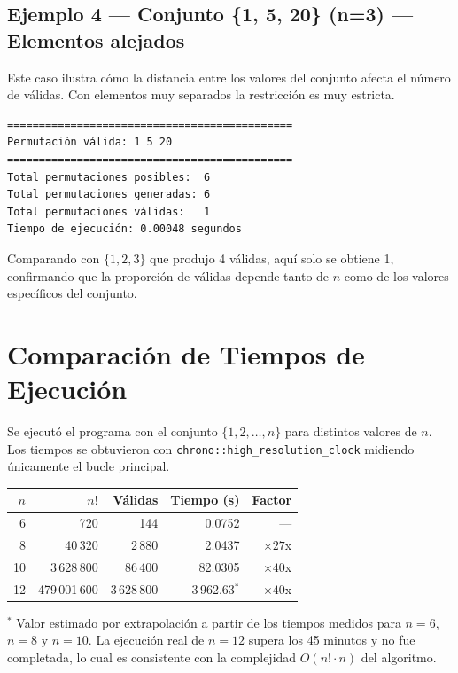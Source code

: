 \documentclass[12pt, a4paper]{article}
\begin{document}
\subsection{Ejemplo 4 --- Conjunto \{1, 5, 20\} (n=3) --- Elementos alejados}

Este caso ilustra cómo la distancia entre los valores del conjunto afecta el número
de válidas. Con elementos muy separados la restricción es muy estricta.

\begin{lstlisting}[style=pseudo]
=============================================
Permutación válida: 1 5 20
=============================================
Total permutaciones posibles:  6
Total permutaciones generadas: 6
Total permutaciones válidas:   1
Tiempo de ejecución: 0.00048 segundos
\end{lstlisting}

Comparando con $\{1, 2, 3\}$ que produjo 4 válidas, aquí solo se obtiene 1,
confirmando que la proporción de válidas depende tanto de $n$ como de los valores
específicos del conjunto.

\section{Comparación de Tiempos de Ejecución}

Se ejecutó el programa con el conjunto $\{1, 2, \ldots, n\}$ para distintos valores
de $n$. Los tiempos se obtuvieron con \texttt{chrono::high\_resolution\_clock}
midiendo únicamente el bucle principal.

\begin{center}
\begin{tabular}{rrrrr}
\toprule
$n$ & $n!$ & Válidas & Tiempo (s) & Factor \\
\midrule
6  & 720              & 144       & 0.0752    & ---      \\
8  & 40\,320          & 2\,880    & 2.0437    & $\times 27$x \\
10 & 3\,628\,800      & 86\,400   & 82.0305   & $\times 40$x \\
12 & 479\,001\,600    & 3\,628\,800 & 3\,962.63$^*$ & $\times 40$x \\
\bottomrule
\end{tabular}
\end{center}

{\small $^*$ Valor estimado por extrapolación a partir de los tiempos medidos para
$n = 6$, $n = 8$ y $n = 10$. La ejecución real de $n = 12$ supera los 45 minutos
y no fue completada, lo cual es consistente con la complejidad $O(n! \cdot n)$
del algoritmo.}
\end{document}
